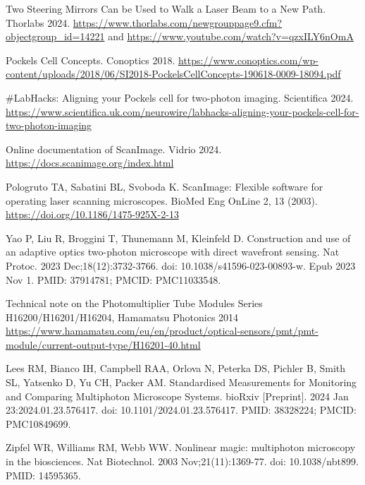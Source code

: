 \documentclass[10pt,letterpaper]{article}
\begin{document}
\begin{thebibliography}{10}

Two Steering Mirrors Can be Used to Walk a Laser Beam to a New Path. Thorlabs 2024. 
\url{https://www.thorlabs.com/newgrouppage9.cfm?objectgroup_id=14221} and \url{https://www.youtube.com/watch?v=qzxILY6nOmA}

Pockels Cell Concepts. Conoptics 2018.
\url{https://www.conoptics.com/wp-content/uploads/2018/06/SI2018-PockelsCellConcepts-190618-0009-18094.pdf}

\#LabHacks: Aligning your Pockels cell for two-photon imaging. Scientifica 2024.
\url{https://www.scientifica.uk.com/neurowire/labhacks-aligning-your-pockels-cell-for-two-photon-imaging}

Online documentation of ScanImage. Vidrio 2024. \url{https://docs.scanimage.org/index.html}

Pologruto TA, Sabatini BL, Svoboda K. ScanImage: Flexible software for operating laser scanning microscopes. BioMed Eng OnLine 2, 13 (2003). \url{https://doi.org/10.1186/1475-925X-2-13}

Yao P, Liu R, Broggini T, Thunemann M, Kleinfeld D. Construction and use of an adaptive optics two-photon microscope with direct wavefront sensing. Nat Protoc. 2023 Dec;18(12):3732-3766. doi: 10.1038/s41596-023-00893-w. Epub 2023 Nov 1. PMID: 37914781; PMCID: PMC11033548.

Technical note on the Photomultiplier Tube Modules Series
H16200/H16201/H16204, Hamamatsu Photonics 2014 \url{https://www.hamamatsu.com/eu/en/product/optical-sensors/pmt/pmt-module/current-output-type/H16201-40.html}

Lees RM, Bianco IH, Campbell RAA, Orlova N, Peterka DS, Pichler B, Smith SL, Yatsenko D, Yu CH, Packer AM. Standardised Measurements for Monitoring and Comparing Multiphoton Microscope Systems. bioRxiv [Preprint]. 2024 Jan 23:2024.01.23.576417. doi: 10.1101/2024.01.23.576417. PMID: 38328224; PMCID: PMC10849699.

Zipfel WR, Williams RM, Webb WW. Nonlinear magic: multiphoton microscopy in the biosciences. Nat Biotechnol. 2003 Nov;21(11):1369-77. doi: 10.1038/nbt899. PMID: 14595365.

\end{thebibliography}
\end{document}
